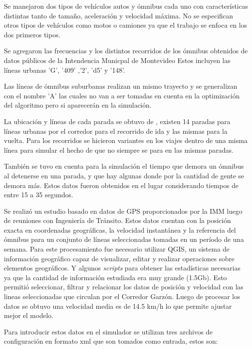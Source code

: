 Se manejaron dos tipos de vehículos autos y ómnibus cada uno con características distintas tanto de tamaño, aceleración y velocidad máxima. No se especifican otros tipos de vehículos como motos o camiones ya que el trabajo se enfoca en los dos primeros tipos.

Se agregaron las frecuencias y los distintos recorridos de los ómnibus obtenidos de datos públicos de la Intendencia Municpal de Montevideo \citep{IMM}
Estos incluyen las líneas urbanas  'G', '409' ,'2', 'd5'  y  '148'. 

Las líneas de ómnibus suburbanas realizan  un mismo  trayecto y se generalizan con el nombre 'A' las cuales no van a ser tomadas en cuenta en la optimización del algoritmo pero si aparecerán en la simulación.

La ubicación y líneas de cada parada se obtuvo de \citep{sigMontevideo}, existen 14 paradas para líneas urbanas por el corredor para el recorrido de ida y las mismas para la vuelta.
Para los recorridos se hicieron  variantes  en  los  viajes  dentro  de  una  misma línea para simular el hecho de que no siempre se para en las mismas paradas.

También se tuvo en cuenta para la simulación el tiempo que demora un ómnibus al detenerse en una parada, y que hay algunas donde por la cantidad de gente se demora más. Estos datos fueron obtenidos en el lugar considerando tiempos de entre 15 a 35 segundos.

Se realizó un estudio basado en datos de GPS proporcionados por la IMM luego de reuniones con Ingeniería de Tránsito. Estos datos cuentan con la posición exacta en coordenadas geográficas, la velocidad instantánea y la referencia del ómnibus para un conjunto de líneas seleccionadas tomadas en un período de una semana. 
Para este procesamiento fue necesario utilizar QGIS, un sistema de información geográfico capaz de visualizar, editar y realizar operaciones sobre elementos geográficos. Y algunos \emph{scripts} para obtener las estadísticas necesarias ya que la cantidad de información estudiada era muy grande (1.5Gb). Esto permitió seleccionar, filtrar y relacionar los datos de posición y velocidad con las lineas seleccionadas que circulan por el Corredor Garzón. Luego de procesar los datos se obtuvo una velocidad media es de 14.5 km/h lo que permite ajustar mejor el modelo. 

Para introducir estos datos en el simulador se utilizan tres archivos de configuración en formato xml que son tomados como entrada, estos son:

